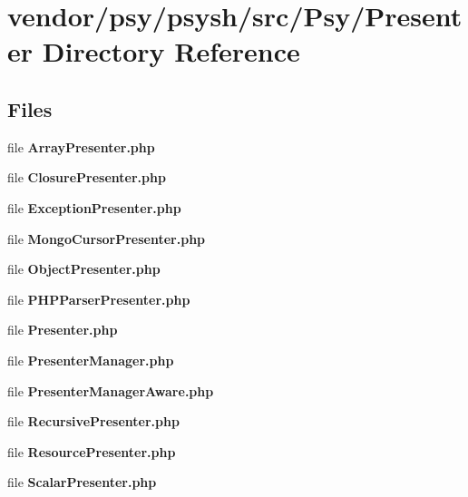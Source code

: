 \section{vendor/psy/psysh/src/\+Psy/\+Presenter Directory Reference}
\label{dir_0f66b946fff67e7cb6409c35bf84cd5c}
\subsection*{Files}
\begin{DoxyCompactItemize}
\item 
file {\bf Array\+Presenter.\+php}
\item 
file {\bf Closure\+Presenter.\+php}
\item 
file {\bf Exception\+Presenter.\+php}
\item 
file {\bf Mongo\+Cursor\+Presenter.\+php}
\item 
file {\bf Object\+Presenter.\+php}
\item 
file {\bf P\+H\+P\+Parser\+Presenter.\+php}
\item 
file {\bf Presenter.\+php}
\item 
file {\bf Presenter\+Manager.\+php}
\item 
file {\bf Presenter\+Manager\+Aware.\+php}
\item 
file {\bf Recursive\+Presenter.\+php}
\item 
file {\bf Resource\+Presenter.\+php}
\item 
file {\bf Scalar\+Presenter.\+php}
\end{DoxyCompactItemize}
